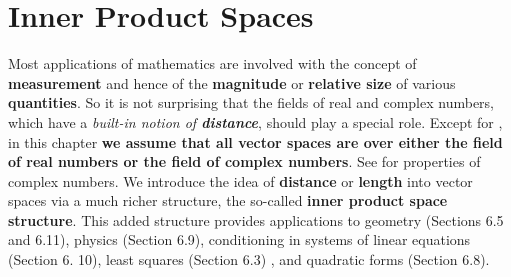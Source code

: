 \chapter{Inner Product Spaces} \label{ch 6}

Most applications of mathematics are involved with the concept of \textbf{measurement} and hence of the \textbf{magnitude} or \textbf{relative size} of various \textbf{quantities}.
So it is not surprising that the fields of real and complex numbers, which have a \emph{built-in notion of \textbf{distance}}, should play a special role.
Except for , in this chapter \textbf{we assume that all vector spaces are over either the field of real numbers or the field of complex numbers}.
See  for properties of complex numbers.
We introduce the idea of \textbf{distance} or \textbf{length} into vector spaces via a much richer structure, the so-called \textbf{inner product space structure}.
This added structure provides applications to geometry (Sections 6.5 and 6.11), physics (Section 6.9), conditioning in systems of linear equations (Section 6. 10), least squares (Section 6.3) , and quadratic forms (Section 6.8).









